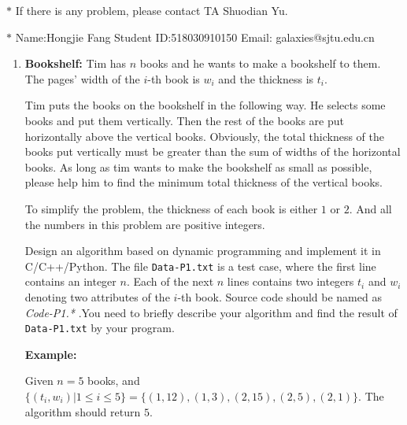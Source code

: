 \documentclass[12pt,a4paper]{article}
\theoremstyle{definition}
\begin{document}
\noindent

\noindent{}
\begin{center}
\footnotesize{\color{red}$*$ If there is any problem, please contact TA Shuodian Yu.}

\footnotesize{\color{blue}$*$ Name:Hongjie Fang  \quad Student ID:518030910150 \quad Email: galaxies@sjtu.edu.cn}
\end{center}

\begin{enumerate}
    \item
    \textbf{Bookshelf: }Tim has $n$ books and he wants to make a bookshelf to them. The pages' width of the $i$-th book is $w_i$ and the thickness is $t_i$.

    Tim puts the books on the bookshelf in the following way. He selects some books and put them vertically. Then the rest of the books are put horizontally above the vertical books. Obviously, the total thickness of the books put vertically must be greater than the sum of widths of the horizontal books. As long as tim wants to make the bookshelf as small as possible, please help him to find the minimum total thickness of the vertical books.

    To simplify the problem, the thickness of each book is either $1$ or $2$. And all the numbers in this problem are positive integers.

    Design an algorithm based on dynamic programming and implement it in C/C++/Python. The file \texttt{Data-P1.txt} is a test case, where the first line contains an integer $n$. Each of the next $n$ lines contains two integers $t_i$ and $w_i$ denoting two attributes of the $i$-th book. Source code should be named as
    {\color{red}\emph{Code-P1.*}} .You need to briefly describe your algorithm and find the result of \texttt{Data-P1.txt} by your program.

    \textbf{Example:}

    Given $n=5$ books, and $\{(t_i,w_i)|1\leq i \leq 5\} = \{(1,12),(1,3),(2,15),(2,5),(2,1)\}$. The algorithm should return $5$.


\end{enumerate}
\end{document}
